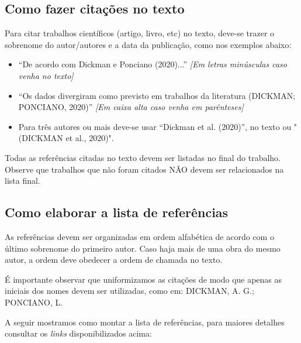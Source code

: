 \documentclass[a4paper,12pt]{article}
\begin{document}
\subsection{Como fazer citações no texto}

Para citar trabalhos científicos (artigo, livro, etc) no texto, deve-se trazer o sobrenome do autor/autores e a data da publicação, como nos exemplos abaixo:

\begin{itemize}
    \item ``De acordo com Dickman e Ponciano (2020)...'' \textit{[Em letras minúsculas caso venha no texto]}
    \item ``Os dados divergiram como previsto em trabalhos da literatura (DICKMAN; PONCIANO, 2020)'' \textit{[Em caixa alta caso venha em parênteses]}
    \item Para três autores ou mais deve-se usar ``Dickman et al. (2020)'', no texto ou "(DICKMAN et al., 2020)".
\end{itemize}

Todas as referências citadas no texto devem ser listadas no final do trabalho. Observe que trabalhos que não foram citados NÃO devem ser relacionados na lista final.

\subsection{Como elaborar a lista de referências}

As referências devem ser organizadas em ordem alfabética de acordo com o último sobrenome do primeiro autor. Caso haja mais de uma obra do mesmo autor, a ordem deve obedecer a ordem de chamada no texto.

É importante observar que uniformizamos as citações de modo que apenas as iniciais dos nomes devem ser utilizadas, como em: DICKMAN, A. G.; PONCIANO, L. 

A seguir mostramos como montar a lista de referências, para maiores detalhes consultar os {\it links} disponibilizados acima:
\end{document}
